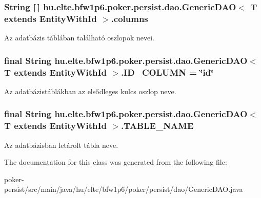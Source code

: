 \subsubsection[{columns}]{\setlength{\rightskip}{0pt plus 5cm}String \mbox{[}$\,$\mbox{]} {\bf hu.\+elte.\+bfw1p6.\+poker.\+persist.\+dao.\+Generic\+D\+A\+O}$<$ T extends {\bf Entity\+With\+Id} $>$.columns\hspace{0.3cm}{\ttfamily [protected]}}\label{classhu_1_1elte_1_1bfw1p6_1_1poker_1_1persist_1_1dao_1_1_generic_d_a_o_ab924ad95106991219162ba286933a3df}
Az adatbázis táblában található oszlopok nevei. \hypertarget{classhu_1_1elte_1_1bfw1p6_1_1poker_1_1persist_1_1dao_1_1_generic_d_a_o_a7cc0f7bbd07c2e355e54601c0c984847}{}
\subsubsection[{I\+D\+\_\+\+C\+O\+L\+U\+M\+N}]{\setlength{\rightskip}{0pt plus 5cm}final String {\bf hu.\+elte.\+bfw1p6.\+poker.\+persist.\+dao.\+Generic\+D\+A\+O}$<$ T extends {\bf Entity\+With\+Id} $>$.I\+D\+\_\+\+C\+O\+L\+U\+M\+N = \char`\"{}id\char`\"{}\hspace{0.3cm}{\ttfamily [protected]}}\label{classhu_1_1elte_1_1bfw1p6_1_1poker_1_1persist_1_1dao_1_1_generic_d_a_o_a7cc0f7bbd07c2e355e54601c0c984847}
Az adatbázistáblákban az elsődleges kulcs oszlop neve. \hypertarget{classhu_1_1elte_1_1bfw1p6_1_1poker_1_1persist_1_1dao_1_1_generic_d_a_o_a03aa5b1d0bc4873b404d4b6a4ba04017}{}
\subsubsection[{T\+A\+B\+L\+E\+\_\+\+N\+A\+M\+E}]{\setlength{\rightskip}{0pt plus 5cm}final String {\bf hu.\+elte.\+bfw1p6.\+poker.\+persist.\+dao.\+Generic\+D\+A\+O}$<$ T extends {\bf Entity\+With\+Id} $>$.T\+A\+B\+L\+E\+\_\+\+N\+A\+M\+E\hspace{0.3cm}{\ttfamily [protected]}}\label{classhu_1_1elte_1_1bfw1p6_1_1poker_1_1persist_1_1dao_1_1_generic_d_a_o_a03aa5b1d0bc4873b404d4b6a4ba04017}
Az adatbázisban letárolt tábla neve. 

The documentation for this class was generated from the following file\+:\begin{DoxyCompactItemize}
\item 
poker-\/persist/src/main/java/hu/elte/bfw1p6/poker/persist/dao/Generic\+D\+A\+O.\+java\end{DoxyCompactItemize}
